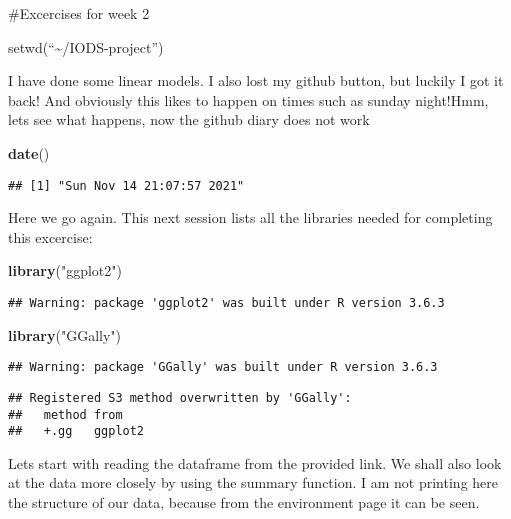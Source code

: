 \documentclass[
]{article}
\author{}
\date{\vspace{-2.5em}}
\newenvironment{Shaded}{\begin{snugshade}}{\end{snugshade}}
\newcommand{\KeywordTok}[1]{\textcolor[rgb]{0.13,0.29,0.53}{\textbf{#1}}}
\newcommand{\NormalTok}[1]{#1}
\newcommand{\StringTok}[1]{\textcolor[rgb]{0.31,0.60,0.02}{#1}}
\begin{document}
\#Excercises for week 2

setwd(``\textasciitilde{}/IODS-project'')

I have done some linear models. I also lost my github button, but
luckily I got it back! And obviously this likes to happen on times such
as sunday night!Hmm, lets see what happens, now the github diary does
not work

\begin{Shaded}
\begin{Highlighting}[]
\KeywordTok{date}\NormalTok{()}
\end{Highlighting}
\end{Shaded}

\begin{verbatim}
## [1] "Sun Nov 14 21:07:57 2021"
\end{verbatim}

Here we go again. This next session lists all the libraries needed for
completing this excercise:

\begin{Shaded}
\begin{Highlighting}[]
\KeywordTok{library}\NormalTok{(}\StringTok{"ggplot2"}\NormalTok{)}
\end{Highlighting}
\end{Shaded}

\begin{verbatim}
## Warning: package 'ggplot2' was built under R version 3.6.3
\end{verbatim}

\begin{Shaded}
\begin{Highlighting}[]
\KeywordTok{library}\NormalTok{(}\StringTok{"GGally"}\NormalTok{)}
\end{Highlighting}
\end{Shaded}

\begin{verbatim}
## Warning: package 'GGally' was built under R version 3.6.3
\end{verbatim}

\begin{verbatim}
## Registered S3 method overwritten by 'GGally':
##   method from   
##   +.gg   ggplot2
\end{verbatim}

Lets start with reading the dataframe from the provided link. We shall
also look at the data more closely by using the summary function. I am
not printing here the structure of our data, because from the
environment page it can be seen.
\end{document}
